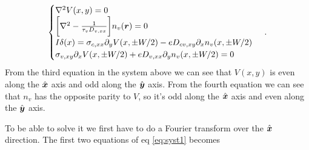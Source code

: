\begin{equation}
    \begin{cases}
        \nabla^2 V(x,y)=0\\
        \bigg[\nabla^2 -\frac 1{\tau_v D_{v,xx}}\bigg]n_v(\boldsymbol{r})=0\\
        I\delta(x)=\sigma_{c,xx}\partial_y V(x,\pm W/2)-eD_{cv,xy}\partial_x n_v(x,\pm W/2)\\
        \sigma_{v,xy}\partial_x V(x,\pm W/2)+eD_{v,xx}\partial_y n_v(x,\pm W/2)=0
    \end{cases}\,.
    \label{eq:syst1}
\end{equation}
From the third equation in the system above we can see that $V(x,y)$ is even along the $\hat{\boldsymbol{x}}$ axis and odd along the $\hat{\boldsymbol{y}}$ axis.\newline
From the fourth equation we can see that $n_v$ has the opposite parity to $V$, so it's odd along the $\hat{\boldsymbol{x}}$ axis and even along the $\hat{\boldsymbol{y}}$ axis.\newline

To be able to solve it we first have to do a Fourier transform over the $\hat{\boldsymbol{x}}$ direction. The first two equations of eq \ref{eq:syst1} becomes


